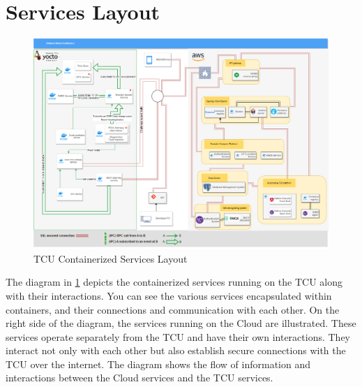 \documentclass[
12pt,
oneside, 
onehalfspacing, 
nolistspacing, 
parskip, 
chapterinoneline, 
]{AASTCOMPUTER}
\begin{document}
\section{Services Layout}
\begin{figure}[h]
\centering
\includegraphics[scale=0.38]{Figures/23.png}
\caption[TCU Containerized Services Layout]{TCU Containerized Services Layout}
\label{fig:TCU Containerized Services Layout}
\end{figure}
The diagram in \ref{fig:TCU Containerized Services Layout} depicts the containerized services running on the TCU along with their interactions. You can see the various services encapsulated within containers, and their connections and communication with each other.
On the right side of the diagram, the services running on the Cloud are illustrated. These services operate separately from the TCU and have their own interactions. They interact not only with each other but also establish secure connections with the TCU over the internet. The diagram shows the flow of information and interactions between the Cloud services and the TCU services.
\end{document}
